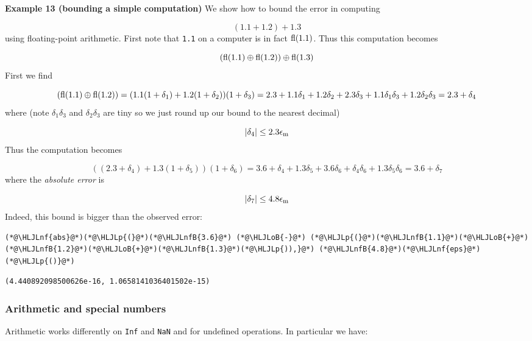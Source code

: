 \documentclass[12pt,a4paper]{article}
\newcommand{\HLJLnf}[1]{\textcolor[RGB]{66,102,213}{#1}}
\newcommand{\HLJLnfB}[1]{\textcolor[RGB]{59,151,46}{#1}}
\newcommand{\HLJLoB}[1]{\textcolor[RGB]{102,102,102}{\textbf{#1}}}
\newcommand{\HLJLp}[1]{#1}
\begin{document}
\textbf{Example 13 (bounding a simple computation)} We show how to bound the error in computing

\[
(1.1 + 1.2) + 1.3
\]
using floating-point arithmetic. First note that \texttt{1.1} on a computer is in fact ${\rm fl}(1.1)$. Thus this computation becomes

\[
({\rm fl}(1.1) \oplus {\rm fl}(1.2)) \oplus {\rm fl}(1.3)
\]
First we find

\[
({\rm fl}(1.1) \oplus {\rm fl}(1.2)) = (1.1(1 + \ensuremath{\delta}_1) + 1.2 (1+\ensuremath{\delta}_2))(1 + \ensuremath{\delta}_3)
 = 2.3 + 1.1 \ensuremath{\delta}_1 + 1.2 \ensuremath{\delta}_2 + 2.3 \ensuremath{\delta}_3 + 1.1 \ensuremath{\delta}_1 \ensuremath{\delta}_3 + 1.2 \ensuremath{\delta}_2 \ensuremath{\delta}_3
 = 2.3 + \ensuremath{\delta}_4
\]
where (note $\ensuremath{\delta}_1 \ensuremath{\delta}_3$ and $\ensuremath{\delta}_2 \ensuremath{\delta}_3$ are tiny so we just round up our bound to the nearest decimal)

\[
|\ensuremath{\delta}_4| \leq 2.3 \ensuremath{\epsilon}_{\rm m}
\]
Thus the computation becomes

\[
((2.3 + \ensuremath{\delta}_4) + 1.3 (1 + \ensuremath{\delta}_5)) (1 + \ensuremath{\delta}_6) = 3.6 + \ensuremath{\delta}_4 + 1.3 \ensuremath{\delta}_5 + 3.6 \ensuremath{\delta}_6 + \ensuremath{\delta}_4 \ensuremath{\delta}_6  + 1.3 \ensuremath{\delta}_5 \ensuremath{\delta}_6 = 3.6 + \ensuremath{\delta}_7
\]
where the \emph{absolute error} is

\[
|\ensuremath{\delta}_7| \leq 4.8 \ensuremath{\epsilon}_{\rm m}
\]
Indeed, this bound is bigger than the observed error:


\begin{lstlisting}
(*@\HLJLnf{abs}@*)(*@\HLJLp{(}@*)(*@\HLJLnfB{3.6}@*) (*@\HLJLoB{-}@*) (*@\HLJLp{(}@*)(*@\HLJLnfB{1.1}@*)(*@\HLJLoB{+}@*)(*@\HLJLnfB{1.2}@*)(*@\HLJLoB{+}@*)(*@\HLJLnfB{1.3}@*)(*@\HLJLp{)),}@*) (*@\HLJLnfB{4.8}@*)(*@\HLJLnf{eps}@*)(*@\HLJLp{()}@*)
\end{lstlisting}

\begin{lstlisting}
(4.440892098500626e-16, 1.0658141036401502e-15)
\end{lstlisting}


\subsubsection{Arithmetic and special numbers}
Arithmetic works differently on \texttt{Inf} and \texttt{NaN} and for undefined operations. In particular we have:
\end{document}
